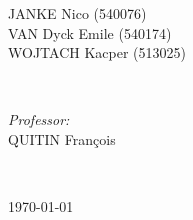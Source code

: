\documentclass[a4paper, twoside, 12pt]{article}
\begin{document}
\begin{titlepage}
\begin{minipage}{0.4\textwidth}
\begin{flushleft}
			JANKE Nico (540076) \\ VAN Dyck Emile (540174) \\ WOJTACH Kacper (513025)
		\end{flushleft}
	\end{minipage}
	~
	\begin{minipage}{0.4\textwidth}
		\begin{flushright} \large
			\emph{Professor:} \\
			QUITIN François
		\end{flushright}
	\end{minipage}\\[2cm]
	\makeatother



	{\large \today}\\[2cm] %


\end{titlepage}
\end{document}
